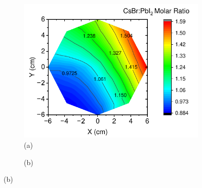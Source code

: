 \begin{figure}[htbp]
    \centering
    \begin{subfigure}[t]{0.6\textwidth}
        \centering
        \includegraphics[width=\textwidth]{chapters/stability/imeges/Molar_Ratio.pdf} %
        \caption*{(a)}
    \end{subfigure}
    \begin{subfigure}[t]{0.25\textwidth}
        \centering
        \caption*{(b)}
    \end{subfigure}


\end{figure}
